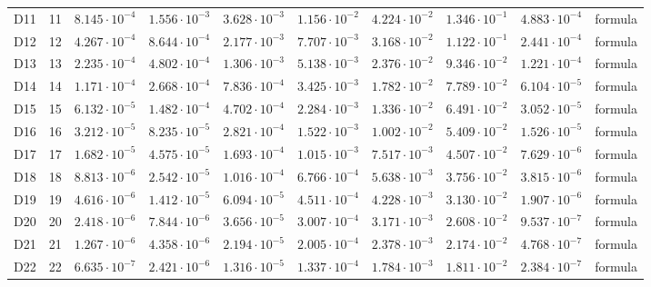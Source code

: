 {\begin{longtable}{@{}llllllllll@{}}
D11 & 11 & $8.145\cdot 10^{-4}$ & $1.556\cdot 10^{-3}$ & $3.628\cdot 10^{-3}$ & $1.156\cdot 10^{-2}$ & $4.224\cdot 10^{-2}$ & $1.346\cdot 10^{-1}$ & $4.883\cdot 10^{-4}$ & formula \\
D12 & 12 & $4.267\cdot 10^{-4}$ & $8.644\cdot 10^{-4}$ & $2.177\cdot 10^{-3}$ & $7.707\cdot 10^{-3}$ & $3.168\cdot 10^{-2}$ & $1.122\cdot 10^{-1}$ & $2.441\cdot 10^{-4}$ & formula \\
D13 & 13 & $2.235\cdot 10^{-4}$ & $4.802\cdot 10^{-4}$ & $1.306\cdot 10^{-3}$ & $5.138\cdot 10^{-3}$ & $2.376\cdot 10^{-2}$ & $9.346\cdot 10^{-2}$ & $1.221\cdot 10^{-4}$ & formula \\
D14 & 14 & $1.171\cdot 10^{-4}$ & $2.668\cdot 10^{-4}$ & $7.836\cdot 10^{-4}$ & $3.425\cdot 10^{-3}$ & $1.782\cdot 10^{-2}$ & $7.789\cdot 10^{-2}$ & $6.104\cdot 10^{-5}$ & formula \\
D15 & 15 & $6.132\cdot 10^{-5}$ & $1.482\cdot 10^{-4}$ & $4.702\cdot 10^{-4}$ & $2.284\cdot 10^{-3}$ & $1.336\cdot 10^{-2}$ & $6.491\cdot 10^{-2}$ & $3.052\cdot 10^{-5}$ & formula \\
D16 & 16 & $3.212\cdot 10^{-5}$ & $8.235\cdot 10^{-5}$ & $2.821\cdot 10^{-4}$ & $1.522\cdot 10^{-3}$ & $1.002\cdot 10^{-2}$ & $5.409\cdot 10^{-2}$ & $1.526\cdot 10^{-5}$ & formula \\
D17 & 17 & $1.682\cdot 10^{-5}$ & $4.575\cdot 10^{-5}$ & $1.693\cdot 10^{-4}$ & $1.015\cdot 10^{-3}$ & $7.517\cdot 10^{-3}$ & $4.507\cdot 10^{-2}$ & $7.629\cdot 10^{-6}$ & formula \\
D18 & 18 & $8.813\cdot 10^{-6}$ & $2.542\cdot 10^{-5}$ & $1.016\cdot 10^{-4}$ & $6.766\cdot 10^{-4}$ & $5.638\cdot 10^{-3}$ & $3.756\cdot 10^{-2}$ & $3.815\cdot 10^{-6}$ & formula \\
D19 & 19 & $4.616\cdot 10^{-6}$ & $1.412\cdot 10^{-5}$ & $6.094\cdot 10^{-5}$ & $4.511\cdot 10^{-4}$ & $4.228\cdot 10^{-3}$ & $3.130\cdot 10^{-2}$ & $1.907\cdot 10^{-6}$ & formula \\
D20 & 20 & $2.418\cdot 10^{-6}$ & $7.844\cdot 10^{-6}$ & $3.656\cdot 10^{-5}$ & $3.007\cdot 10^{-4}$ & $3.171\cdot 10^{-3}$ & $2.608\cdot 10^{-2}$ & $9.537\cdot 10^{-7}$ & formula \\
D21 & 21 & $1.267\cdot 10^{-6}$ & $4.358\cdot 10^{-6}$ & $2.194\cdot 10^{-5}$ & $2.005\cdot 10^{-4}$ & $2.378\cdot 10^{-3}$ & $2.174\cdot 10^{-2}$ & $4.768\cdot 10^{-7}$ & formula \\
D22 & 22 & $6.635\cdot 10^{-7}$ & $2.421\cdot 10^{-6}$ & $1.316\cdot 10^{-5}$ & $1.337\cdot 10^{-4}$ & $1.784\cdot 10^{-3}$ & $1.811\cdot 10^{-2}$ & $2.384\cdot 10^{-7}$ & formula \\

\end{longtable}}
